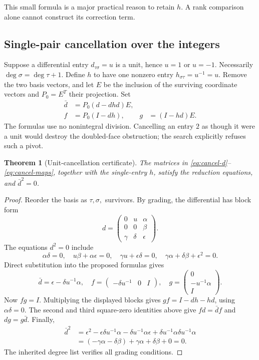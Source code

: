\documentclass[11pt,letterpaper]{article}
\newtheorem{theorem}{Theorem}[section]
\theoremstyle{definition}\newtheorem{definition}[theorem]{Definition}
\theoremstyle{remark}\newtheorem{remark}[theorem]{Remark}
\begin{document}
This small formula is a major practical reason to retain $h$. A rank comparison
alone cannot construct its correction term.

\subsection{Single-pair cancellation over the integers}
Suppose a differential entry $d_{\tau\sigma}=u$ is a unit, hence $u=1$ or
$u=-1$. Necessarily $\deg\sigma=\deg\tau+1$. Define $h$ to have one nonzero
entry $h_{\sigma\tau}=u^{-1}=u$. Remove the two basis vectors, and let $E$ be
the inclusion of the surviving coordinate vectors and $P_0=E^T$ their
projection. Set
\begin{align}
 \bar d&=P_0(d-dhd)E,\label{eq:cancel-d}\\
 f&=P_0(I-dh),& g&=(I-hd)E.\label{eq:cancel-maps}
\end{align}
The formulas use no nonintegral division. Cancelling an entry $2$ as though it
were a unit would destroy the doubled-face obstruction; the search explicitly
refuses such a pivot.

\begin{theorem}[Unit-cancellation certificate]\label{thm:cancel}
The matrices in \eqref{eq:cancel-d}--\eqref{eq:cancel-maps}, together with the
single-entry $h$, satisfy the reduction equations, and $\bar d^2=0$.
\end{theorem}
\begin{proof}
Reorder the basis as $\tau,\sigma,$ survivors. By grading, the differential has
block form
\[
 d=\begin{pmatrix}0&u&\alpha\\0&0&\beta\\
 \gamma&\delta&\epsilon\end{pmatrix}.
\]
The equations $d^2=0$ include
\[
 \alpha\delta=0,\quad u\beta+\alpha\epsilon=0,\quad
 \gamma u+\epsilon\delta=0,\quad
 \gamma\alpha+\delta\beta+\epsilon^2=0.
\]
Direct substitution into the proposed formulas gives
\[
 \bar d=\epsilon-\delta u^{-1}\alpha,\quad
 f=\begin{pmatrix}-\delta u^{-1}&0&I\end{pmatrix},\quad
 g=\begin{pmatrix}0\\-u^{-1}\alpha\\I\end{pmatrix}.
\]
Now $fg=I$. Multiplying the displayed blocks gives
$gf=I-dh-hd$, using $\alpha\delta=0$. The second and third square-zero
identities above give $fd=\bar d f$ and $dg=g\bar d$.
Finally,
\begin{align*}
 \bar d^2
 &=\epsilon^2-\epsilon\delta u^{-1}\alpha
   -\delta u^{-1}\alpha\epsilon
   +\delta u^{-1}\alpha\delta u^{-1}\alpha\\
 &=(-\gamma\alpha-\delta\beta)+\gamma\alpha+\delta\beta+0=0.
\end{align*}
The inherited degree list verifies all grading conditions.
\end{proof}
\end{document}
